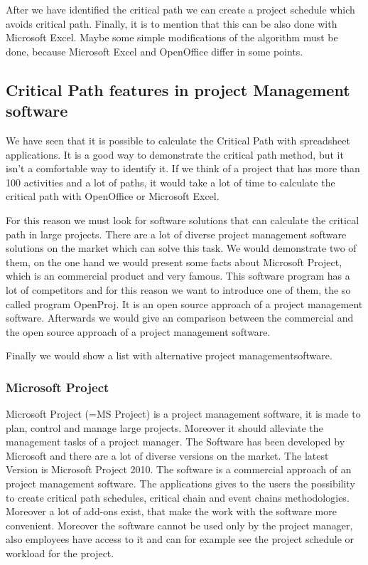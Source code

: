After we have identified the critical path we can create a project schedule which avoids critical path. Finally, it is to mention that this can be also done with Microsoft Excel. Maybe some simple modifications of the algorithm must be done, because Microsoft Excel and OpenOffice differ in some points.

\subsection{Critical Path features in project Management software}
We have seen that it is possible to calculate the Critical Path with spreadsheet applications. It is a good way to demonstrate the critical path method, but it isn't a comfortable way to identify it. If we think of a project that has more than 100 activities and a lot of paths, it would take a lot of time to calculate the critical path with OpenOffice or Microsoft Excel. 

For this reason we must look for software solutions that can calculate the critical path in large projects. There are a lot of diverse project management software solutions on the market which can solve this task. We would demonstrate two of them, on the one hand we would present some facts about Microsoft Project, which is an commercial product and very famous. This software program has a lot of competitors and for this reason we want to introduce one of them, the so called program OpenProj. It is an open source approach of a project management software. Afterwards we would give an comparison between the commercial and the open source approach of a project management software.

Finally we would show a list with alternative project managementsoftware.

\subsubsection{Microsoft Project}
Microsoft Project (=MS Project) is a project management software, it is made to plan, control and manage large projects. Moreover it should alleviate the management tasks of a project manager. 
The Software has been developed by Microsoft and there are a lot of diverse versions on the market. The latest Version is Microsoft Project 2010. The software is a commercial approach of an project management software.
The applications gives to the users the possibility to create critical path schedules, critical chain and event chains methodologies. Moreover a lot of add-ons exist, that make the work with the software more convenient. Moreover the software cannot be used only by the project manager, also employees have access to it and can for example see the project schedule or workload for the project.

